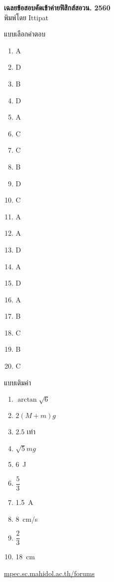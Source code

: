 \documentclass[a4paper,12pt]{article}
\begin{document}
	\thispagestyle{empty}
	\begin{center}
		{\huge \textbf{เฉลยข้อสอบคัดเข้าค่ายฟิสิกส์สอวน. 2560}}\\
		พิมพ์โดย Ittipat\\
	\end{center}
	\begin{multicols}{2}
		แบบเลือกคำตอบ
		\begin{enumerate}
			\item A
			\item D
			\item B
			\item D
			\item A
			\item C
			\item C
			\item B
			\item D
			\item C
			\item A
			\item A
			\item D
			\item A
			\item D
			\item A
			\item B
			\item C
			\item B
			\item C
		\end{enumerate}
		\columnbreak
		แบบเติมคำ
		\begin{enumerate}
			\item \(\arctan\sqrt{6}\)
			\item \(2(M+m)g\)
			\item \(2.5\) เท่า
			\item \(\sqrt{5}mg\)
			\item \SI{6}{J}
			\item \(\dfrac{5}{3}\)
			\item \SI{1.5}{A}
			\item \SI{8}{cm/s}
			\item \(\dfrac{2}{3}\)
			\item \SI{18}{cm}
		\end{enumerate}
	\end{multicols}
	\vfill
	\begin{center}
		\href{http://mpec.sc.mahidol.ac.th/forums/}{mpec.sc.mahidol.ac.th/forums}
	\end{center}
\end{document}
